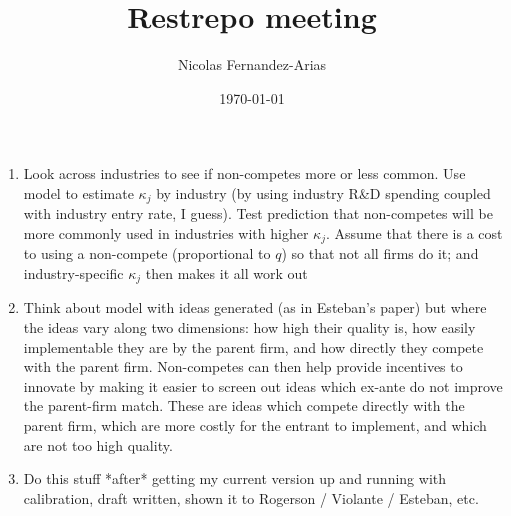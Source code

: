 \documentclass[12pt,english]{article}
\theoremstyle{remark}
\begin{document}
	
\title{Restrepo meeting}
\author{Nicolas Fernandez-Arias}
\date{\today}


\begin{enumerate}
	\item Look across industries to see if non-competes more or less common. Use model to estimate $\kappa_j$ by industry (by using industry R\&D spending coupled with industry entry rate, I guess). Test prediction that non-competes will be more commonly used in industries with higher $\kappa_j$. Assume that there is a cost to using a non-compete (proportional to $q$) so that not all firms do it; and industry-specific $\kappa_j$ then makes it all work out
	\item Think about model with ideas generated (as in Esteban's paper) but where the ideas vary along two dimensions: how high their quality is, how easily implementable they are by the parent firm, and how directly they compete with the parent firm. Non-competes can then help provide incentives to innovate by making it easier to screen out ideas which ex-ante do not improve the parent-firm match. These are ideas which compete directly with the parent firm, which are more costly for the entrant to implement, and which are not too high quality. 
	\item Do this stuff *after* getting my current version up and running with calibration, draft written, shown it to Rogerson / Violante / Esteban, etc.
\end{enumerate}
\end{document}

